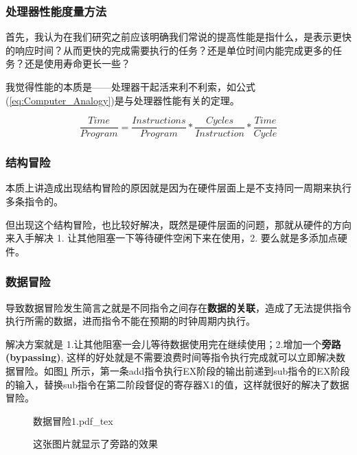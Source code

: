 \subsubsection{处理器性能度量方法}
首先，我认为在我们研究之前应该明确我们常说的提高性能是指什么，是表示更快的响应时间？从而更快的完成需要执行的任务？还是单位时间内能完成更多的任务？还是使用寿命更长一些？

我觉得性能的本质是——处理器干起活来利不利索，如公式(\ref{eq:Computer_Analogy})是与处理器性能有关的定理。

\begin{equation}\label{eq:Computer_Analogy}
    \frac{ Time }{ Program } = \frac{ Instructions }{ Program } * \frac{ Cycles }{ Instruction } * \frac{ Time }{ Cycle }
\end{equation}

\subsubsection{结构冒险}
本质上讲造成出现结构冒险的原因就是因为在硬件层面上是不支持同一周期来执行多条指令的。

但出现这个结构冒险，也比较好解决，既然是硬件层面的问题，那就从硬件的方向来入手解决 1. 让其他阻塞一下等待硬件空闲下来在使用，2. 要么就是多添加点硬件。


\subsubsection{数据冒险}
导致数据冒险发生简言之就是不同指令之间存在\textbf{数据的关联}，造成了无法提供指令执行所需的数据，进而指令不能在预期的时钟周期内执行。

解决方案就是 1.让其他阻塞一会儿等待数据使用完在继续使用；2.增加一个\textbf{旁路(bypassing)},
这样的好处就是不需要浪费时间等指令执行完成就可以立即解决数据冒险。如图\ref{fig:Data_Hazards1} 所示，第一条add指令执行EX阶段的输出前递到sub指令的EX阶段的输入，替换sub指令在第二阶段督促的寄存器X1的值，这样就很好的解决了数据冒险。

\begin{figure}[htbp]
    \centering
    \def\svgwidth{\columnwidth}
    {数据冒险1.pdf_tex}
    \caption{这张图片就显示了旁路的效果}
    \label{fig:Data_Hazards1}
\end{figure}

